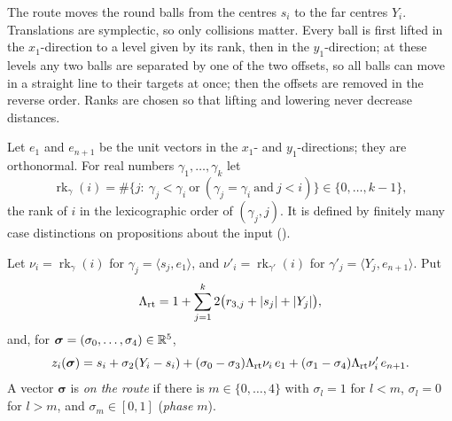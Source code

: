 The route moves the round balls from the centres $s_i$ to the far centres $Y_i$. Translations are symplectic, so only
collisions matter. Every ball is first lifted in the $x_1$-direction to a level given by its rank, then in the
$y_1$-direction; at these levels any two balls are separated by one of the two offsets, so all balls can move in a
straight line to their targets at once; then the offsets are removed in the reverse order. Ranks are chosen so that
lifting and lowering never decrease distances.

Let $e_1$ and $e_{n+1}$ be the unit vectors in the $x_1$- and $y_1$-directions; they are orthonormal. For real numbers
$\gamma_1,\dots,\gamma_k$ let
\[
 \operatorname{rk}_\gamma(i)=\#\{j:\ \gamma_j<\gamma_i\ \text{or}\ (\gamma_j=\gamma_i\ \text{and}\ j<i)\}\in\{0,\dots,k-1\},
\]
the rank of $i$ in the lexicographic order of $(\gamma_j,j)$. It is defined by finitely many case distinctions on
propositions about the input ().

\begin{definition}\label{def:iso-route}
Let $\nu_i=\operatorname{rk}_\gamma(i)$ for $\gamma_j=\langle s_j,e_1\rangle$, and $\nu'_i=\operatorname{rk}_{\gamma'}(i)$ for
$\gamma'_j=\langle Y_j,e_{n+1}\rangle$. Put
\[
 \Lambda_{\rm rt}=1+\sum_{j=1}^k2\big(r_{3,j}+|s_j|+|Y_j|\big),
\]
and, for $\boldsymbol\sigma=(\sigma_0,\dots,\sigma_4)\in\mathbb{R}^5$,
\[
 z_i(\boldsymbol\sigma)=s_i+\sigma_2(Y_i-s_i)+(\sigma_0-\sigma_3)\Lambda_{\rm rt}\nu_i\,e_1+(\sigma_1-\sigma_4)\Lambda_{\rm rt}\nu'_i\,e_{n+1} .
\]
A vector $\boldsymbol\sigma$ is \emph{on the route} if there is $m\in\{0,\dots,4\}$ with $\sigma_l=1$ for $l<m$, $\sigma_l=0$ for
$l>m$, and $\sigma_m\in[0,1]$ (\emph{phase} $m$).
\end{definition}

